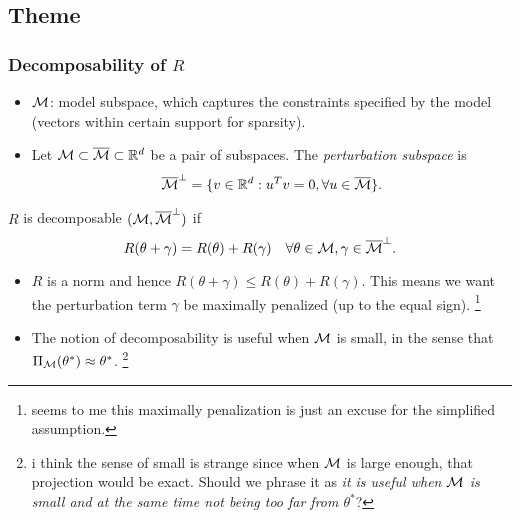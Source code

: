 \subsection{Theme}

\subsubsection{Decomposability of $R$}

\begin{itemize}
    \item $\mathcal{M}$: model subspace,
        which captures the constraints specified by the model
        (\eg vectors within certain support for sparsity).
    \item Let $\mathcal{M} \subset {\overline{\mathcal{M}}} \subset {\mathbb{R}}^d$ be a pair of subspaces.
        The \emph{perturbation subspace} is
        \begin{equation}
            {\overline{\mathcal{M}}}^\perp = \{v\in{\mathbb{R}}^d: u^Tv=0, \forall u\in{\overline{\mathcal{M}}}\}.
        \end{equation}
\end{itemize}

\begin{define}
    $R$ is decomposable \wrt $(\mathcal{M}, {\overline{\mathcal{M}}}^\perp)$ if
    \begin{equation}
        R(\theta+\gamma) = R(\theta) + R(\gamma) \quad
        \forall \theta \in \mathcal{M}, \gamma \in {\overline{\mathcal{M}}}^\perp.
    \end{equation}
\end{define}

\begin{obs} \leavevmode
\begin{itemize}
    \item $R$ is a norm and hence
        $R(\theta+\gamma)\le R(\theta) + R(\gamma)$.
        This means we want the perturbation term $\gamma$ be
        maximally penalized (up to the equal sign).
        \footnote{seems to me this maximally penalization is just an excuse for
        the simplified assumption.}
    \item The notion of decomposability is useful when $\mathcal{M}$ is small,
        in the sense that $\Pi_{\mathcal{M}}(\theta^*)\approx\theta^*$.
        \footnote{i think the sense of small is strange since when
        $\mathcal{M}$ is large enough, that projection would be exact.
        Should we phrase it as
        \emph{it is useful when $\mathcal{M}$ is small and
        at the same time not being too far from $\theta^*$}?}
\end{itemize}
\end{obs}

